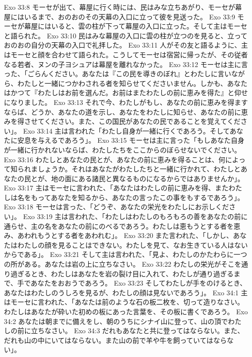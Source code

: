 Exo 33:8  モーセが出て、幕屋に行く時には、民はみな立ちあがり、モーセが幕屋にはいるまで、おのおのその天幕の入口に立って彼を見送った。
Exo 33:9  モーセが幕屋にはいると、雲の柱が下って幕屋の入口に立った。そして主はモーセと語られた。
Exo 33:10  民はみな幕屋の入口に雲の柱が立つのを見ると、立っておのおの自分の天幕の入口で礼拝した。
Exo 33:11  人がその友と語るように、主はモーセと顔を合わせて語られた。こうしてモーセは宿営に帰ったが、その従者なる若者、ヌンの子ヨシュアは幕屋を離れなかった。
Exo 33:12  モーセは主に言った、「ごらんください。あなたは『この民を導きのぼれ』とわたしに言いながら、わたしと一緒につかわされる者を知らせてくださいません。しかも、あなたはかつて『わたしはお前を選んだ。お前はまたわたしの前に恵みを得た』と仰せになりました。
Exo 33:13  それで今、わたしがもし、あなたの前に恵みを得ますならば、どうか、あなたの道を示し、あなたをわたしに知らせ、あなたの前に恵みを得させてください。また、この国民があなたの民であることを覚えてください」。
Exo 33:14  主は言われた「わたし自身が一緒に行くであろう。そしてあなたに安息を与えるであろう」。
Exo 33:15  モーセは主に言った「もしあなた自身が一緒に行かれないならば、わたしたちをここからのぼらせないでください。
Exo 33:16  わたしとあなたの民とが、あなたの前に恵みを得ることは、何によって知られましょうか。それはあなたがわたしたちと一緒に行かれて、わたしとあなたの民とが、地の面にある諸民と異なるものになるからではありませんか」。
Exo 33:17  主はモーセに言われた、「あなたはわたしの前に恵みを得、またわたしは名をもってあなたを知るから、あなたの言ったこの事をもするであろう」。
Exo 33:18  モーセは言った、「どうぞ、あなたの栄光をわたしにお示しください」。
Exo 33:19  主は言われた、「わたしはわたしのもろもろの善をあなたの前に通らせ、主の名をあなたの前にのべるであろう。わたしは恵もうとする者を恵み、あわれもうとする者をあわれむ」。
Exo 33:20  また言われた、「しかし、あなたはわたしの顔を見ることはできない。わたしを見て、なお生きている人はないからである」。
Exo 33:21  そして主は言われた、「見よ、わたしのかたわらに一つの所がある。あなたは岩の上に立ちなさい。
Exo 33:22  わたしの栄光がそこを通り過ぎるとき、わたしはあなたを岩の裂け目に入れて、わたしが通り過ぎるまで、手であなたをおおうであろう。
Exo 33:23  そしてわたしが手をのけるとき、あなたはわたしのうしろを見るが、わたしの顔は見ないであろう」。
Exo 34:1  主はモーセに言われた、「あなたは前のような石の板二枚を、切って造りなさい。わたしはあなたが砕いた初めの板にあった言葉を、その板に書くであろう。
Exo 34:2  あなたは朝までに備えをし、朝のうちにシナイ山に登って、山の頂でわたしの前に立ちなさい。
Exo 34:3  だれもあなたと共に登ってはならない。また、だれも山の中にいてはならない。また山の前で羊や牛を飼っていてはならない」。
